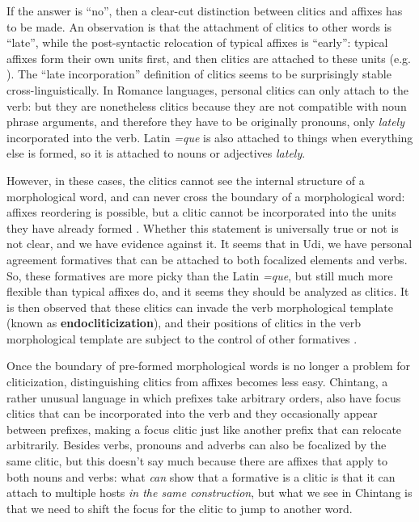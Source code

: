 \documentclass[a4paper, oneside, scheme=plain, 12pt]{article}
\newcommand*{\citepage}[1]{p.~{#1}}
\newcommand*{\concept}[1]{\textbf{#1}}
\newcommand{\form}[1]{\emph{#1}}
\begin{document}
If the answer is ``no'', then a clear-cut distinction between clitics and affixes has to be made.
An observation is that the attachment of clitics to other words is ``late'',
while the post-syntactic relocation of typical affixes is ``early'':
typical affixes form their own units first, and then clitics are attached to these units
(e.g. \citealt[\citepage{485}]{jacques2021grammar}).
The ``late incorporation'' definition of clitics seems to be surprisingly stable cross-linguistically.
In Romance languages, personal clitics can only attach to the verb:
but they are nonetheless clitics because they are not compatible with noun phrase arguments,
and therefore they have to be originally pronouns,
only \emph{lately} incorporated into the verb.
Latin \form{=que} is also attached to things when everything else is formed,
so it is attached to nouns or adjectives \emph{lately}.

However, in these cases, the clitics cannot see the internal structure of a morphological word,
and can never cross the boundary of a morphological word:
affixes reordering is possible, but a clitic cannot be incorporated into the units they have already formed
\citep{embick2007linearization}.
Whether this statement is universally true or not is not clear,
and we have evidence against it.
It seems that in Udi, we have personal agreement formatives
that can be attached to both focalized elements and verbs.
So, these formatives are more picky than the Latin \form{=que}, but still much more flexible than typical affixes do,
and it seems they should be analyzed as clitics.
It is then observed that these clitics can invade the verb morphological template
(known as \concept{endocliticization}),
and their positions of clitics in the verb morphological template 
are subject to the control of other formatives \citep{harris2000word}.

Once the boundary of pre-formed morphological words is no longer a problem for cliticization,
distinguishing clitics from affixes becomes less easy.
Chintang, a rather unusual language in which prefixes take arbitrary orders,
also have focus clitics that can be incorporated into the verb and
they occasionally appear between prefixes,
making a focus clitic just like another prefix that can relocate arbitrarily.
Besides verbs, pronouns and adverbs can also be focalized by the same clitic,
but this doesn't say much because there are affixes that apply to both nouns and verbs:
what \emph{can} show that a formative is a clitic is that
it can attach to multiple hosts \emph{in the same construction},
but what we see in Chintang is that we need to shift the focus 
for the clitic to jump to another word.
\end{document}

